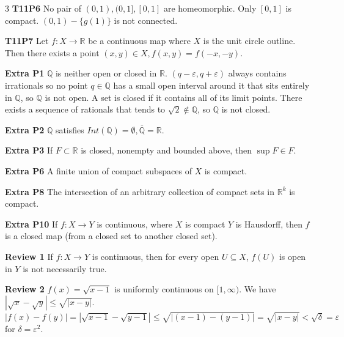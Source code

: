 \documentclass[10pt, landscape]{article}
\begin{document}
\begin{multicols*}{3}
\textbf{T11P6} No pair of $(0,1),(0,1],[0,1]$ are homeomorphic. Only $[0,1]$ is compact. $(0,1)-\{g(1)\}$ is not connected.

\textbf{T11P7} Let $f: X \rightarrow \mathbb{R}$ be a continuous map where $X$ is the unit circle outline. Then there exists a point $(x, y) \in X, f(x, y) = f(-x, -y)$.

\textbf{Extra P1} $\mathbb{Q}$ is neither open or closed in $\mathbb{R}$. $(q - \varepsilon, q+\varepsilon)$ always contains irrationals so no point $q \in \mathbb{Q}$ has a small open interval around it that sits entirely in $\mathbb{Q}$, so $\mathbb{Q}$ is not open. A set is closed if it contains all of its limit points. There exists a sequence of rationals that tends to $\sqrt{2} \notin \mathbb{Q}$, so $\mathbb{Q}$ is not closed.

\textbf{Extra P2} $\mathbb{Q}$ satisfies $Int(\mathbb{Q})=\emptyset, \overline{\mathbb{Q}} = \mathbb{R}$.

\textbf{Extra P3} If $F \subset \mathbb{R}$ is closed, nonempty and bounded above, then $\sup F \in F$.

\textbf{Extra P6} A finite union of compact subspaces of $X$ is compact.

\textbf{Extra P8} The intersection of an arbitrary collection of compact sets in $\mathbb{R}^k$ is compact.

\textbf{Extra P10} If $f: X \rightarrow Y$ is continuous, where $X$ is compact $Y$ is Hausdorff, then $f$ is a closed map (from a closed set to another closed set).

\textbf{Review 1} If $f: X \rightarrow Y$ is continuous, then for every open $U \subseteq X$, $f(U)$ is open in $Y$ is not necessarily true.

\textbf{Review 2} $f(x)=\sqrt{x-1}$ is uniformly continuous on $[1, \infty)$. We have $|\sqrt{x}-\sqrt{y}| \leq \sqrt{|x-y|}$. $|f(x)-f(y)|=|\sqrt{x-1}-\sqrt{y-1}|\leq\sqrt{|(x-1)-(y-1)|}=\sqrt{|x-y|}< \sqrt{\delta}=\varepsilon$ for $\delta = \varepsilon^2$.

\end{multicols*}
\end{document}
